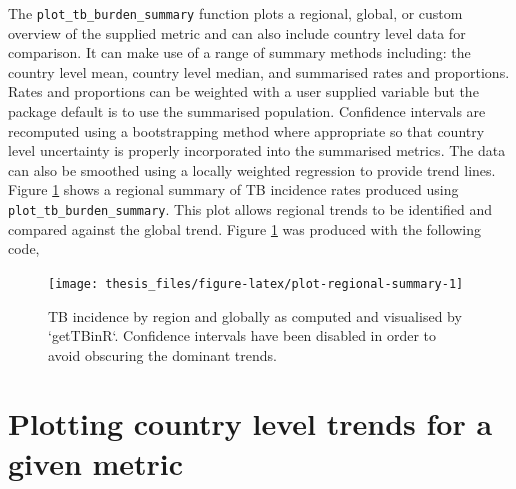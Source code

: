 \documentclass[11pt,twoside]{bristolthesis}
\begin{document}
  The \texttt{plot\_tb\_burden\_summary} function plots a regional, global, or custom overview of the supplied metric and can also include country level data for comparison. It can make use of a range of summary methods including: the country level mean, country level median, and summarised rates and proportions. Rates and proportions can be weighted with a user supplied variable but the package default is to use the summarised population. Confidence intervals are recomputed using a bootstrapping method where appropriate so that country level uncertainty is properly incorporated into the summarised metrics. The data can also be smoothed using a locally weighted regression to provide trend lines. Figure \ref{fig:plot-regional-summary} shows a regional summary of TB incidence rates produced using \texttt{plot\_tb\_burden\_summary}. This plot allows regional trends to be identified and compared against the global trend. Figure \ref{fig:plot-regional-summary} was produced with the following code,
  \begin{Shaded}
  \begin{Highlighting}[]
  \NormalTok{(} \NormalTok{, } \NormalTok{,}
                          \NormalTok{)}
  \end{Highlighting}
  \end{Shaded}
  \begin{figure}
  
  {\centering \texttt{[image: thesis\_files/figure-latex/plot-regional-summary-1]} 
  
  }
  
  \caption{TB incidence by region and globally as computed and visualised by `getTBinR`. Confidence intervals have been disabled in order to avoid obscuring the dominant trends.}\label{fig:plot-regional-summary}
  \end{figure}
  \hypertarget{plotting-country-level-trends-for-a-given-metric}{%
  \section{Plotting country level trends for a given metric}\label{plotting-country-level-trends-for-a-given-metric}}
  
\end{document}
